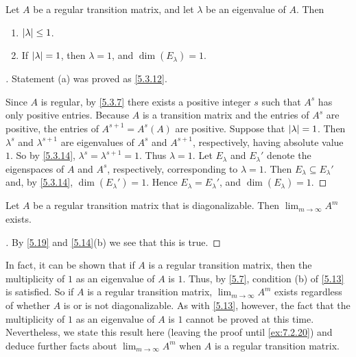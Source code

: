\begin{thm}\label{5.19}
  Let \(A\) be a regular transition matrix, and let \(\lambda\) be an eigenvalue of \(A\).
  Then
  \begin{enumerate}
    \item \(\left\lvert\lambda\right\rvert \leq 1\).
    \item If \(\left\lvert\lambda\right\rvert = 1\), then \(\lambda = 1\), and \(\dim(E_{\lambda}) = 1\).
  \end{enumerate}
\end{thm}

\begin{proof}[]
  Statement (a) was proved as \cref{5.3.12}.

  Since \(A\) is regular, by \cref{5.3.7} there exists a positive integer \(s\) such that \(A^s\) has only positive entries.
  Because \(A\) is a transition matrix and the entries of \(A^s\) are positive, the entries of \(A^{s + 1} = A^s (A)\) are positive.
  Suppose that \(\left\lvert\lambda\right\rvert = 1\).
  Then \(\lambda^s\) and \(\lambda^{s + 1}\) are eigenvalues of \(A^s\) and \(A^{s + 1}\), respectively, having absolute value \(1\).
  So by \cref{5.3.14}, \(\lambda^s = \lambda^{s + 1} = 1\).
  Thus \(\lambda = 1\).
  Let \(E_{\lambda}\) and \(E_{\lambda}'\) denote the eigenspaces of \(A\) and \(A^s\), respectively, corresponding to \(\lambda = 1\).
  Then \(E_{\lambda} \subseteq E_{\lambda}'\) and, by \cref{5.3.14}, \(\dim(E_{\lambda}') = 1\).
  Hence \(E_{\lambda} = E_{\lambda}'\), and \(\dim(E_{\lambda}) = 1\).
\end{proof}

\begin{cor}\label{5.3.15}
  Let \(A\) be a regular transition matrix that is diagonalizable.
  Then \(\lim_{m \to \infty} A^m\) exists.
\end{cor}

\begin{proof}[]
  By \cref{5.19} and \cref{5.14}(b) we see that this is true.
\end{proof}

\begin{note}
  In fact, it can be shown that if \(A\) is a regular transition matrix, then the multiplicity of \(1\) as an eigenvalue of \(A\) is \(1\).
  Thus, by \cref{5.7}, condition (b) of \cref{5.13} is satisfied.
  So if \(A\) is a regular transition matrix, \(\lim_{m \to \infty} A^m\) exists regardless of whether \(A\) is or is not diagonalizable.
  As with \cref{5.13}, however, the fact that the multiplicity of \(1\) as an eigenvalue of \(A\) is \(1\) cannot be proved at this time.
  Nevertheless, we state this result here (leaving the proof until \cref{ex:7.2.20}) and deduce further facts about \(\lim_{m \to \infty} A^m\) when \(A\) is a regular transition matrix.
\end{note}

